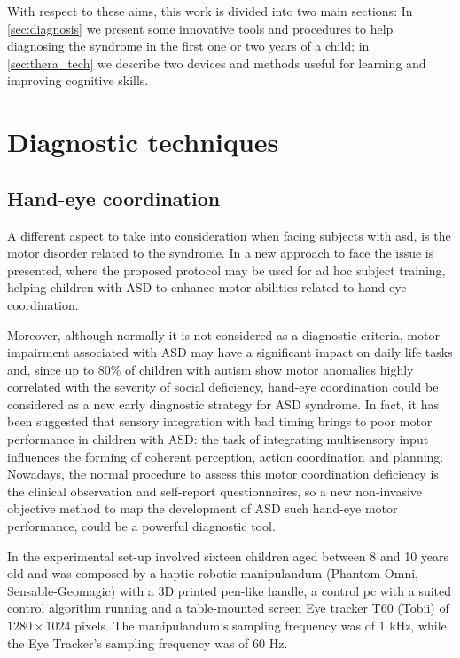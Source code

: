\documentclass[12pt,journal,draftclsnofoot,onecolumn]{IEEEtran}
\makeatletter
\let\origsubsubsection\subsubsection
\renewcommand\subsubsection{\@ifstar{\starsubsubsection}{\nostarsubsubsection}}
\newcommand\nostarsubsubsection[1]
{\subsubsectionprelude\origsubsubsection{#1}}
\newcommand\subsubsectionprelude{%
  \vspace{6pt}
}
\makeatother
\begin{document}
With respect to these aims, this work is divided into two main sections: In \autoref{sec:diagnosis} we present some innovative tools and procedures to help diagnosing the syndrome in the first one or two years of a child; in \autoref{sec:thera_tech} we describe two devices and methods useful for learning and improving cognitive skills.

\section{Diagnostic techniques}
\label{sec:diagnosis}

\subsection{Hand-eye coordination}
\label{sec:hand_eye}
A different aspect to take into consideration when facing subjects with \gls{asd}, is the motor disorder related to the syndrome. In \cite{Casellato2017} a new approach to face the issue is presented, where the proposed protocol may be used for ad hoc subject training, helping children with ASD to enhance motor abilities related to hand-eye coordination.

Moreover, although normally it is not considered as a diagnostic criteria, motor impairment associated with ASD may have a significant impact on daily life tasks and, since up to 80\% of children with autism show motor anomalies highly correlated with the severity of social deficiency, hand-eye coordination could be considered as a new early diagnostic strategy for ASD syndrome. In fact, it has been suggested that sensory integration with bad timing brings to poor motor performance in children with ASD: the task of integrating multisensory input influences the forming of coherent perception, action coordination and planning. Nowadays, the normal procedure to assess this motor coordination deficiency is the clinical observation and self-report questionnaires, so a new non-invasive objective method to map the development of ASD such hand-eye motor performance, could be a powerful diagnostic tool.

\subsubsection{Material and methods}
In \cite{Casellato2017} the experimental set-up involved sixteen children aged between 8 and 10 years old and was composed by a haptic robotic manipulandum (Phantom Omni, Sensable-Geomagic) with a 3D printed pen-like handle, a control pc with a suited control algorithm running and a table-mounted screen Eye tracker T60 (Tobii) of $1280\times1024$ pixels. The manipulandum's sampling frequency was of 1 kHz, while the Eye Tracker's sampling frequency was of 60 Hz.
\end{document}
